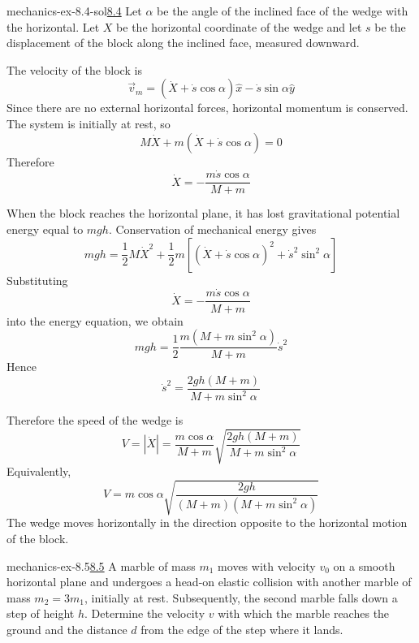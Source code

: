 \documentclass[preview]{standalone}
\begin{document}
\begin{snippetsolution}{mechanics-ex-8.4-sol}{\underline{8.4}}
    Let \(\alpha\) be the angle of the inclined face of the wedge with the
    horizontal. Let \(X\) be the horizontal coordinate of the wedge and let \(s\)
    be the displacement of the block along the inclined face, measured downward.

    The velocity of the block is
    \[
        \vec v_m
        =
        (\dot X+\dot s\cos\alpha)\hat x
        -
        \dot s\sin\alpha \hat y
    \]
    Since there are no external horizontal forces, horizontal momentum is conserved.
    The system is initially at rest, so
    \[
        M\dot X + m(\dot X+\dot s\cos\alpha)=0
    \]
    Therefore
    \[
        \dot X
        =
        -\frac{m\dot s\cos\alpha}{M+m}
    \]

    When the block reaches the horizontal plane, it has lost gravitational potential
    energy equal to \(mgh\). Conservation of mechanical energy gives
    \[
        mgh
        =
        \frac{1}{2}M\dot X^2
        +
        \frac{1}{2}m
        \left[
            (\dot X+\dot s\cos\alpha)^2
            +
            \dot s^2\sin^2\alpha
        \right]
    \]
    Substituting
    \[
        \dot X
        =
        -\frac{m\dot s\cos\alpha}{M+m}
    \]
    into the energy equation, we obtain
    \[
        mgh
        =
        \frac{1}{2}
        \frac{m(M+m\sin^2\alpha)}{M+m}
        \dot s^2
    \]
    Hence
    \[
        \dot s^2
        =
        \frac{2gh(M+m)}{M+m\sin^2\alpha}
    \]

    Therefore the speed of the wedge is
    \[
        V
        =
        |\dot X|
        =
        \frac{m\cos\alpha}{M+m}
        \sqrt{
            \frac{2gh(M+m)}{M+m\sin^2\alpha}
        }
    \]
    Equivalently,
    \[
        V
        =
        m\cos\alpha
        \sqrt{
            \frac{2gh}
            {(M+m)(M+m\sin^2\alpha)}
        }
    \]
    The wedge moves horizontally in the direction opposite to the horizontal motion
    of the block.
\end{snippetsolution}

\begin{snippetexercise}{mechanics-ex-8.5}{\underline{8.5}}
    A marble of mass \(m_1\) moves with velocity \(v_0\) on a smooth horizontal plane and undergoes
    a head-on elastic collision with another marble of mass \(m_2 = 3m_1\), initially at rest.
    Subsequently, the second marble falls down a step of height \(h\).
    Determine the velocity \(v\) with which the marble reaches the ground and the distance \(d\)
    from the edge of the step where it lands.
\end{snippetexercise}
\end{document}
